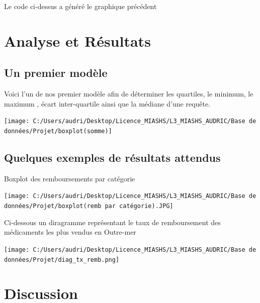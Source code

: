 \documentclass[mstat,12pt]{unswthesis}
\begin{document}
\bigskip
\bigskip
\bigskip
\centering

Le code ci-dessus a généré le graphique précédent \bigskip

\hypertarget{analyse-et-ruxe9sultats}{%
\chapter{Analyse et Résultats}\label{analyse-et-ruxe9sultats}}

\hypertarget{un-premier-moduxe8le}{%
\section{Un premier modèle}\label{un-premier-moduxe8le}}

\bigskip
\bigskip

Voici l'un de nos premier modèle afin de déterminer les quartiles, le
minimum, le maximum , écart inter-quartile ainsi que la médiane d'une
requête. \bigskip

\bigskip
\bigskip

\texttt{[image: C:/Users/audri/Desktop/Licence\_MIASHS/L3\_MIASHS\_AUDRIC/Base de données/Projet/boxplot(somme)]}

\bigskip
\bigskip

\hypertarget{quelques-exemples-de-ruxe9sultats-attendus}{%
\section{Quelques exemples de résultats
attendus}\label{quelques-exemples-de-ruxe9sultats-attendus}}

\bigskip
\centering

Boxplot des remboursements par catégorie \bigskip

\bigskip

\texttt{[image: C:/Users/audri/Desktop/Licence\_MIASHS/L3\_MIASHS\_AUDRIC/Base de données/Projet/boxplot(remb par catégorie).JPG]}

\medskip

Ci-dessous un diragramme représentant le taux de remboursement des
médicaments les plus vendus en Outre-mer \bigskip

\bigskip
\bigskip

\texttt{[image: C:/Users/audri/Desktop/Licence\_MIASHS/L3\_MIASHS\_AUDRIC/Base de données/Projet/diag\_tx\_remb.png]}

\hypertarget{discussion}{%
\chapter{Discussion}\label{discussion}}
\end{document}

